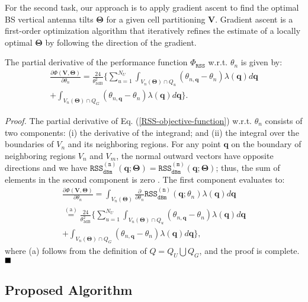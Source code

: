 For the second task, our approach is to apply gradient ascent to find the optimal BS vertical antenna tilts $\bm{\Theta}$ for a given cell partitioning $\bm{V}$. Gradient ascent is a first-order optimization algorithm that iteratively refines the estimate of a locally optimal $\bm{\Theta}$ by following the direction of the gradient.
\begin{Proposition}\label{rss-grad-eq}
The partial derivative of the performance function $\Phi_{\mathtt{RSS}}$ w.r.t. $\theta_n$ is given by:
\begin{align}\label{eqn:derivativePhidBm}
\frac{\partial \Phi(\bm{V},\bm{\Theta})}{\partial \theta_n}  =   \frac{24}{\theta^2_{\text{3dB}}} \Bigg\{ \sum_{u=1}^{N_U}
      \int_{V_n(\mathbf{\Theta})\cap Q_u} \!\!\! (\theta_{n,\bm{q}}-\theta_n) \lambda(\bm{q}) d\bm{q}   \nonumber\\+ \int_{V_n(\mathbf{\Theta})\cap Q_G} \!\!\! (\theta_{n,\bm{q}}-\theta_n) \lambda(\bm{q}) d\bm{q} \Bigg\}.
\end{align}
\end{Proposition}
\textit{Proof. }The partial derivative of Eq. (\ref{RSS-objective-function}) w.r.t. $\theta_n$ consists of two components: (i) the derivative of the integrand; and (ii) the integral over the boundaries of $V_n$ and its neighboring regions. For any point $\bm{q}$ on the boundary of neighboring regions $V_n$ and $V_m$, the normal outward vectors have opposite directions and we have $\mathtt{RSS_{dBm}^{(n)}}(\bm{q}; \bm{\Theta}) = \mathtt{RSS_{dBm}^{(m)}}(\bm{q}; \bm{\Theta})$; thus, the sum of elements in the second component is zero \cite{GuoJaf2016}. The first component evaluates to:
\begin{multline}\label{eqn:derivativePhi}
    \frac{\partial \Phi(\mathbf{V},\mathbf{\Theta})}{\partial \theta_n} = \int_{V_n(\mathbf{\Theta})} \frac{\partial}{\partial \theta_n} \mathtt{RSS_{dBm}^{(n)}}(\bm{q}; \theta_n) \lambda(\bm{q})d\bm{q}  \\
    \stackrel{(\text{a})}{=}  \frac{24}{\theta^2_{\text{3dB}}} \Bigg\{ \sum_{u=1}^{N_U}
      \int_{V_n(\mathbf{\Theta})\cap Q_u}  (\theta_{n,\bm{q}}-\theta_n) \lambda(\bm{q}) d\bm{q}   
      \\+  \int_{V_n(\mathbf{\Theta})\cap Q_G}  (\theta_{n,\bm{q}}-\theta_n) \lambda(\bm{q}) d\bm{q} \Bigg\},
\end{multline}
where (a) follows from the definition of $Q = Q_U \bigcup Q_G$, and the proof is complete. $\hfill\blacksquare$


\subsection{Proposed Algorithm}\label{RSS-Algorithm}

